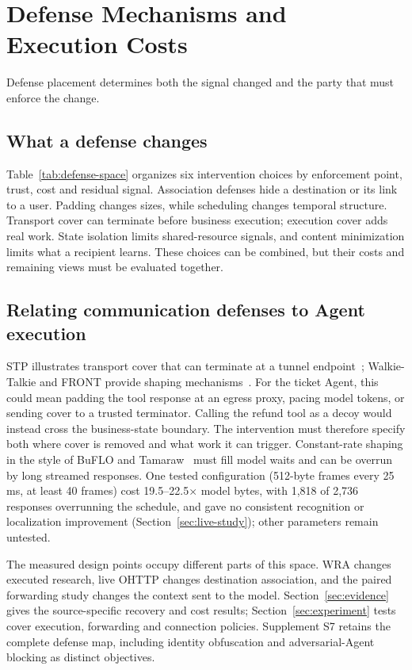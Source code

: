 \section{Defense Mechanisms and Execution Costs}\label{sec:defenses}
Defense placement determines both the signal changed and the party that must enforce the change.
\subsection{What a defense changes}
Table~\ref{tab:defense-space} organizes six intervention choices by enforcement point, trust, cost and residual signal. Association defenses hide a destination or its link to a user. Padding changes sizes, while scheduling changes temporal structure. Transport cover can terminate before business execution; execution cover adds real work. State isolation limits shared-resource signals, and content minimization limits what a recipient learns. These choices can be combined, but their costs and remaining views must be evaluated together.




\subsection{Relating communication defenses to Agent execution}
STP illustrates transport cover that can terminate at a tunnel endpoint~\cite{apthorpe2019stp}; Walkie-Talkie and FRONT provide shaping mechanisms~\cite{wang2017walkietalkie,gong2020front}. For the ticket Agent, this could mean padding the tool response at an egress proxy, pacing model tokens, or sending cover to a trusted terminator. Calling the refund tool as a decoy would instead cross the business-state boundary. The intervention must therefore specify both where cover is removed and what work it can trigger. Constant-rate shaping in the style of BuFLO and Tamaraw~\cite{dyer2012peekaboo,cai2014tamaraw} must fill model waits and can be overrun by long streamed responses. One tested configuration (512-byte frames every 25\,ms, at least 40 frames) cost 19.5--22.5$\times$ model bytes, with 1,818 of 2,736 responses overrunning the schedule, and gave no consistent recognition or localization improvement (Section~\ref{sec:live-study}); other parameters remain untested.

The measured design points occupy different parts of this space. WRA changes executed research, live OHTTP changes destination association, and the paired forwarding study changes the context sent to the model. Section~\ref{sec:evidence} gives the source-specific recovery and cost results; Section~\ref{sec:experiment} tests cover execution, forwarding and connection policies. Supplement S7 retains the complete defense map, including identity obfuscation and adversarial-Agent blocking as distinct objectives.

